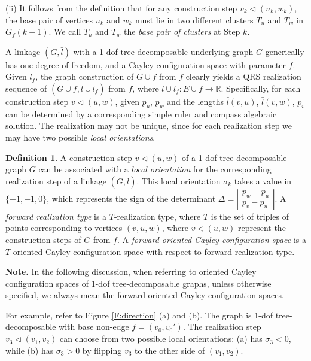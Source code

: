 \documentclass[secthm,amsthm,english]{article}
\theoremstyle{definition}
\newtheorem{definition}{Definition}
\theoremstyle{remark}
\begin{document}
\noindent (ii) It follows from the definition that for any construction step $v_k \triangleleft (u_k,w_k)$, 
the base pair of vertices $u_k$ and $w_k$ must lie in two different clusters $T_{u}$ and $T_{w}$ in $G_{f}(k-1)$. 
We call $T_{u}$ and $T_{w}$ the \emph{base pair of clusters} at Step $k$.

\smallskip





A linkage $(G,\bar{l})$ with a 1-dof tree-decomposable underlying graph $G$ generically has one degree of freedom,
and a  Cayley configuration space with parameter $f$.
Given $l_f$, the graph construction of $G \cup f$ from $f$ clearly yields a QRS realization sequence of $(G \cup f, \bar{l} \cup l_f)$ from $f$, where $\bar{l} \cup l_f: E \cup {f} \rightarrow \mathbb{R}$. 
Specifically, for each construction step $v \triangleleft (u,w)$,
given  $p_u$, $p_w$ and the lengths $\bar{l}(v,u)$, $\bar{l}(v,w)$,
$p_v$ can be determined by a corresponding simple ruler and compass algebraic solution. 
The realization may not be unique, since for each realization step we may have two possible \emph{local orientations}.

\begin{definition} \label{def:solution-type}
A construction step  $v \triangleleft (u,w)$ of a 1-dof tree-decomposable graph $G$
can be associated with a {\emph{local orientation}} for the corresponding realization step of a linkage $(G,\bar{l})$.
This local orientation $\sigma_{k}$ takes a value in $\{+1,-1,0\}$, 
which represents the sign of the determinant $\varDelta = \left|\begin{array}{c}p_w-p_u\\p_v-p_u\end{array}\right|$. 
A {\emph{forward realization type}} is a $T$-realization type, 
where $T$ is the set of triples of points corresponding to vertices $(v,u,w)$, 
where $v \triangleleft (u,w)$ represent the construction steps of $G$ from $f$.
A {\emph{forward-oriented Cayley configuration space}} is a $T$-oriented Cayley configuration space with respect to forward realization type. 
\end{definition}

\noindent\textbf{Note.}
In the following discussion, 
when referring to oriented Cayley configuration spaces of 1-dof tree-decomposable graphs,
unless otherwise specified, 
we always mean the forward-oriented Cayley configuration spaces. 
\smallskip

For example, refer to Figure \ref{F:direction} (a) and (b). The graph
is 1-dof tree-decomposable with base non-edge $f=(v_{0},v_{0}')$. The realization
step $v_{3}\triangleleft(v_{1},v_{2})$ can choose from two possible local orientations:
(a) has $\sigma_3 < 0$, while (b) has $ \sigma_3 > 0$ by flipping $v_{3}$ to the other side of $(v_{1},v_{2})$. 
\end{document}
